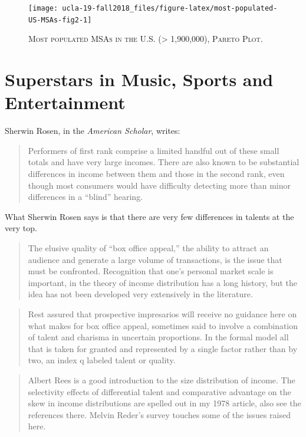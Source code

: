 \documentclass[]{book}
\theoremstyle{definition}
\theoremstyle{definition}
\theoremstyle{definition}
\theoremstyle{remark}
\begin{document}
\begin{figure}

{\centering \texttt{[image: ucla-19-fall2018\_files/figure-latex/most-populated-US-MSAs-fig2-1]} 

}

\caption{\textsc{Most populated MSAs in the
U.S. (\textgreater{} 1,900,000), Pareto Plot.}}\label{fig:most-populated-US-MSAs-fig2}
\end{figure}

\hypertarget{music-entertainment-superstars}{\chapter{Superstars in
Music, Sports and Entertainment}\label{music-entertainment-superstars}}

Sherwin Rosen, in the \emph{American Scholar}, writes:

\begin{quote}
Performers of first rank comprise a limited handful out of these small
totals and have very large incomes. There are also known to be
substantial differences in income between them and those in the second
rank, even though most consumers would have difficulty detecting more
than minor differences in a ``blind'' hearing.
\end{quote}

What Sherwin Rosen says is that there are very few differences in
talents at the very top.

\begin{quote}
The elusive quality of ``box office appeal,'' the ability to attract an
audience and generate a large volume of transactions, is the issue that
must be confronted. Recognition that one's personal market scale is
important, in the theory of income distribution has a long history, but
the idea has not been developed very extensively in the literature.
\end{quote}

\begin{quote}
Rest assured that prospective impresarios will receive no guidance here
on what makes for box office appeal, sometimes said to involve a
combination of talent and charisma in uncertain proportions. In the
formal model all that is taken for granted and represented by a single
factor rather than by two, an index q labeled talent or quality.
\end{quote}

\begin{quote}
Albert Rees is a good introduction to the size distribution of income.
The selectivity effects of differential talent and comparative advantage
on the skew in income distributions are spelled out in my 1978 article,
also see the references there. Melvin Reder's survey touches some of the
issues raised here.
\end{quote}
\end{document}
